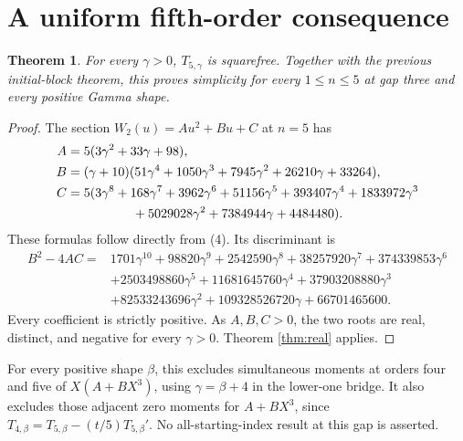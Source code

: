 \documentclass[11pt]{article}
\newtheorem{theorem}{Theorem}
\begin{document}
\section{A uniform fifth-order consequence}
\begin{theorem}\label{thm:fifth}
For every $\gamma>0$, $T_{5,\gamma}$ is squarefree. Together with the
previous initial-block theorem, this proves simplicity for every
$1\le n\le5$ at gap three and every positive Gamma shape.
\end{theorem}
\begin{proof}
The section $W_2(u)=A u^2+B u+C$ at $n=5$ has
\begin{align*}
 A&=5(3\gamma^2+33\gamma+98),\\
 B&=(\gamma+10)(51\gamma^4+1050\gamma^3+7945\gamma^2
                                     +26210\gamma+33264),\\
 C&=5(3\gamma^8+168\gamma^7+3962\gamma^6+51156\gamma^5
       +393407\gamma^4+1833972\gamma^3\\
   &\hspace{18mm}+5029028\gamma^2+7384944\gamma+4484480).
\end{align*}
These formulas follow directly from (4). Its discriminant is
\begin{align*}
 B^2-4AC={}&1701\gamma^{10}+98820\gamma^9+2542590\gamma^8
 +38257920\gamma^7+374339853\gamma^6\\
 &+2503498860\gamma^5+11681645760\gamma^4
 +37903208880\gamma^3\\
 &+82533243696\gamma^2+109328526720\gamma+66701465600.
\end{align*}
Every coefficient is strictly positive. As $A,B,C>0$, the two roots
are real, distinct, and negative for every $\gamma>0$.
Theorem \ref{thm:real} applies.
\end{proof}
For every positive shape $\beta$, this excludes simultaneous moments
at orders four and five of $X(A+BX^3)$, using $\gamma=\beta+4$ in
the lower-one bridge. It also excludes those adjacent zero moments for
$A+BX^3$, since $T_{4,\beta}=T_{5,\beta}-(t/5)T_{5,\beta}'$.
No all-starting-index result at this gap is asserted.
\end{document}
